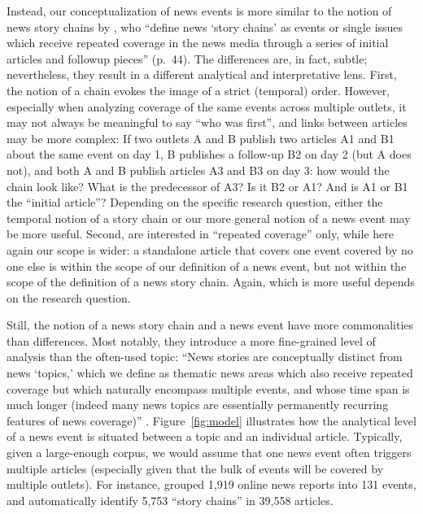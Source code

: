 \documentclass[a4paper,man,natbib,floatsintext,mask]{apa6}
\begin{document}
Instead, our conceptualization of news events is more similar to the notion of news story chains by \cite{Nicholls2018}, who ``define news `story chains' as events or single issues which receive repeated coverage in the news media through a series of initial articles and followup pieces'' (p.~44). The differences are, in fact, subtle; nevertheless, they result in a different analytical and interpretative lens. First, the notion of a chain evokes the image of a strict (temporal) order. However, especially when analyzing coverage of the same events across multiple outlets, it may not always be meaningful to say ``who was first'', and links between articles may be more complex: If two outlets A and B publish two articles A1 and B1 about the same event on day 1, B publishes a follow-up B2 on day 2 (but A does not), and both A and B publish articles A3 and B3 on day 3: how would the chain look like? What is the predecessor of A3? Is it B2 or A1? And is A1 or B1 the ``initial article''? Depending on the specific research question, either the temporal notion of a story chain or our more general notion of a news event may be more useful. 
Second, \cite{Nicholls2018} are interested in ``repeated coverage'' only, while here again our scope is wider: a standalone article that covers one event covered by no one else is within the scope of our definition of a news event, but not within the scope of the definition of a news story chain. Again, which is more useful depends on the research question.

Still, the notion of a news story chain and a news event have more commonalities than differences. Most notably, they introduce a more fine-grained level of analysis than the often-used topic: ``News stories are conceptually distinct from news `topics,' which we define as thematic news areas which also receive repeated coverage but which naturally encompass multiple events, and whose time span is much longer (indeed many news topics are essentially permanently recurring features of news coverage)'' \citep[p.~44]{Nicholls2018}.
Figure~\ref{fig:model} illustrates how the analytical level of a news event is situated between a topic and an individual article. 
Typically, given a large-enough corpus, we would assume that one news event often triggers multiple articles (especially given that the bulk of events will be covered by multiple outlets). For instance, \cite{Buhl2016} grouped 1,919 online news reports into 131 events, and \cite{Nicholls2018} automatically identify 5,753 ``story chains'' in 39,558 articles.
\end{document}
